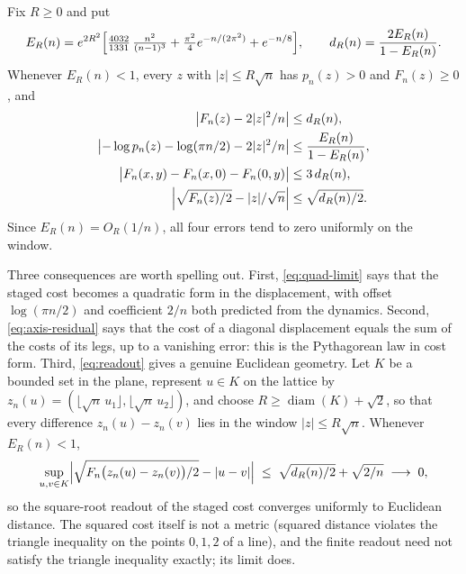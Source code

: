 \begin{corollary}
\label{cor:quadratic}
Fix $R\ge0$ and put
\begin{equation}
E_R(n)=e^{2R^2}\Bigl[\tfrac{4032}{1331}\,\tfrac{n^2}{(n-1)^3}+\tfrac{\pi^2}{4}e^{-n/(2\pi^2)}+e^{-n/8}\Bigr],\qquad d_R(n)=\frac{2E_R(n)}{1-E_R(n)}.
\end{equation}
Whenever $E_R(n)<1$, every $z$ with $|z|\le R\sqrt n$ has $p_n(z)>0$ and $F_n(z)\ge0$, and
\begin{align}
\bigl|F_n(z)-2|z|^2/n\bigr|&\le d_R(n), \label{eq:quad-limit}\\
\bigl|-\log p_n(z)-\log(\pi n/2)-2|z|^2/n\bigr|&\le \frac{E_R(n)}{1-E_R(n)},\\
\bigl|F_n(x,y)-F_n(x,0)-F_n(0,y)\bigr|&\le3\,d_R(n), \label{eq:axis-residual}\\
\Bigl|\sqrt{F_n(z)/2}-|z|/\sqrt n\Bigr|&\le\sqrt{d_R(n)/2}. \label{eq:readout}
\end{align}
Since $E_R(n)=O_R(1/n)$, all four errors tend to zero uniformly on the window.
\end{corollary}


Three consequences are worth spelling out.
First, \eqref{eq:quad-limit} says that the staged cost becomes a quadratic form in the displacement, with offset $\log(\pi n/2)$ and coefficient $2/n$ both predicted from the dynamics.
Second, \eqref{eq:axis-residual} says that the cost of a diagonal displacement equals the sum of the costs of its legs, up to a vanishing error: this is the Pythagorean law in cost form.
Third, \eqref{eq:readout} gives a genuine Euclidean geometry.
Let $K$ be a bounded set in the plane, represent $u\in K$ on the lattice by $z_n(u)=(\lfloor\sqrt n\,u_1\rfloor,\lfloor\sqrt n\,u_2\rfloor)$, and choose $R\ge\operatorname{diam}(K)+\sqrt2$, so that every difference $z_n(u)-z_n(v)$ lies in the window $|z|\le R\sqrt n$. Whenever $E_R(n)<1$,
\begin{equation}
\sup_{u,v\in K}\Bigl|\sqrt{F_n\bigl(z_n(u)-z_n(v)\bigr)/2}-|u-v|\Bigr|\;\le\;\sqrt{d_R(n)/2}+\sqrt{2/n}\;\longrightarrow\;0,
\end{equation}
so the square-root readout of the staged cost converges uniformly to Euclidean distance.
The squared cost itself is not a metric (squared distance violates the triangle inequality on the points $0,1,2$ of a line), and the finite readout need not satisfy the triangle inequality exactly; its limit does.

